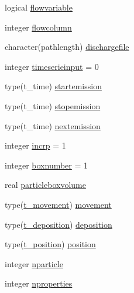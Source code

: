 \begin{DoxyCompactItemize}
logical \mbox{\hyperlink{structmodulelagrangian_1_1t__origin_af70b0f770da59720baefd512749ae1eb}{flowvariable}}
\item 
integer \mbox{\hyperlink{structmodulelagrangian_1_1t__origin_aa3fdf695fe4fd1b760c3fa3e505dec16}{flowcolumn}}
\item 
character(pathlength) \mbox{\hyperlink{structmodulelagrangian_1_1t__origin_a7081be571da83b1c3f3586965e37a825}{dischargefile}}
\item 
integer \mbox{\hyperlink{structmodulelagrangian_1_1t__origin_aa07a492324fe28d13650ce4ac7af35a6}{timeserieinput}} = 0
\item 
type(t\+\_\+time) \mbox{\hyperlink{structmodulelagrangian_1_1t__origin_a712cc48a81da6e54f76c841518fcda77}{startemission}}
\item 
type(t\+\_\+time) \mbox{\hyperlink{structmodulelagrangian_1_1t__origin_a77ed94d364526894eeee8828b2621de8}{stopemission}}
\item 
type(t\+\_\+time) \mbox{\hyperlink{structmodulelagrangian_1_1t__origin_a2ed7a2ce9366f4e2a2ddf1cfa59f8ce8}{nextemission}}
\item 
integer \mbox{\hyperlink{structmodulelagrangian_1_1t__origin_a4578772492b11456a5b789bdae01ebfb}{incrp}} = 1
\item 
integer \mbox{\hyperlink{structmodulelagrangian_1_1t__origin_a5810500018114cff0ce0e3935a3b7f96}{boxnumber}} = 1
\item 
real \mbox{\hyperlink{structmodulelagrangian_1_1t__origin_ac21bfb7b2d6db876bfa5569174159d9a}{particleboxvolume}}
\item 
type(\mbox{\hyperlink{structmodulelagrangian_1_1t__movement}{t\+\_\+movement}}) \mbox{\hyperlink{structmodulelagrangian_1_1t__origin_a5b9343d6baecc861af4177ed2fd6e625}{movement}}
\item 
type(\mbox{\hyperlink{structmodulelagrangian_1_1t__deposition}{t\+\_\+deposition}}) \mbox{\hyperlink{structmodulelagrangian_1_1t__origin_ac4a8983e16711ce2f3307c4ef0d0dade}{deposition}}
\item 
type(\mbox{\hyperlink{structmodulelagrangian_1_1t__position}{t\+\_\+position}}) \mbox{\hyperlink{structmodulelagrangian_1_1t__origin_afc00d168fce1e0595dc1cf733e7d7174}{position}}
\item 
integer \mbox{\hyperlink{structmodulelagrangian_1_1t__origin_a6860f9a23dfbffd46e7b1c38047fd155}{nparticle}}
\item 
integer \mbox{\hyperlink{structmodulelagrangian_1_1t__origin_a0c443f9271f184f6357894c224066758}{nproperties}}
\item 

\end{DoxyCompactItemize}
